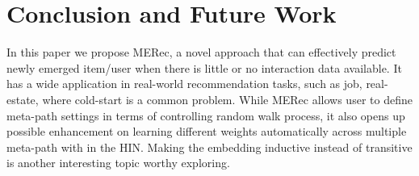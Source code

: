 \section{Conclusion and Future Work}
In this paper we propose MERec, a novel approach that can effectively predict newly emerged item/user when there is little or no interaction data available. It has a wide application in real-world recommendation tasks, such as job, real-estate, where cold-start is a common problem. 
While MERec allows user to define meta-path settings in terms of controlling random walk process, it also opens up possible enhancement on learning different weights automatically across multiple meta-path with in the HIN. Making the embedding inductive instead of transitive is another interesting topic worthy exploring.